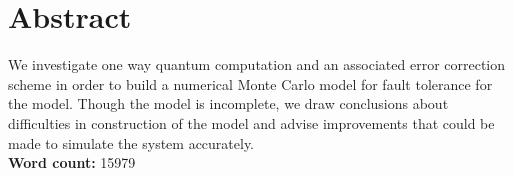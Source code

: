 

\begingroup
\let\clearpage\relax
\let\cleardoublepage\relax
\let\cleardoublepage\relax

\chapter*{Abstract} %

We investigate one way quantum computation and an associated error correction scheme in order to build a numerical Monte Carlo model for fault tolerance for the model. Though the model is incomplete, we draw conclusions about difficulties in construction of the model and advise improvements that could be made to simulate the system accurately. \\

\textbf{Word count:} 15979

\endgroup			

\vfill